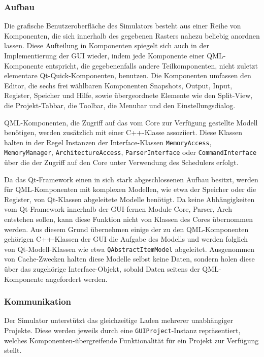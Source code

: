 \subsubsection{Aufbau}

Die grafische Benutzeroberfläche des Simulators besteht aus einer Reihe von
Komponenten, die sich innerhalb des gegebenen Rasters nahezu beliebig anordnen
lassen. Diese Aufteilung in Komponenten spiegelt sich auch in der
Implementierung der GUI wieder, indem jede Komponente einer QML-Komponente
entspricht, die gegebenenfalls andere Teilkomponenten, nicht zuletzt elementare
Qt-Quick-Komponenten, benutzen. Die Komponenten umfassen den Editor, die sechs
frei wählbaren Komponenten Snapshots, Output, Input, Register, Speicher und
Hilfe, sowie übergeordnete Elemente wie den Split-View, die Projekt-Tabbar, die
Toolbar, die Menubar und den Einstellungsdialog.

QML-Komponenten, die Zugriff auf das vom Core zur Verfügung gestellte Modell
benötigen, werden zusätzlich mit einer C++-Klasse assoziiert. Diese Klassen
halten in der Regel Instanzen der Interface-Klassen \texttt{MemoryAccess},
\texttt{MemoryManager}, \texttt{ArchitectureAccess}, \texttt{ParserInterface}
oder \texttt{CommandInterface}  über die der Zugriff auf den Core unter
Verwendung des Schedulers erfolgt.

Da das Qt-Framework einen in sich stark abgeschlossenen Aufbau besitzt, werden
für QML-Komponenten mit komplexen Modellen, wie etwa der Speicher oder die
Register, von Qt-Klassen abgeleitete Modelle benötigt. Da keine Abhängigkeiten
vom Qt-Framework innerhalb der GUI-fernen Module Core, Parser, Arch entstehen
sollen, kann diese Funktion nicht von Klassen des Cores übernommen werden. Aus
diesem Grund übernehmen einige der zu den QML-Komponenten gehörigen C++-Klassen
der GUI die Aufgabe des Modells und werden folglich von Qt-Modell-Klassen wie
etwa \texttt{QAbstractItemModel} abgeleitet. Ausgenommen von Cache-Zwecken
halten diese Modelle selbst keine Daten, sondern holen diese über das zugehörige
Interface-Objekt, sobald Daten seitens der QML-Komponente angefordert werden.

\subsubsection{Kommunikation}
\label{gui-kommunikation}

Der Simulator unterstützt das gleichzeitige Laden mehrerer unabhängiger
Projekte. Diese werden jeweils durch eine \texttt{GUIProject}-Instanz
repräsentiert, welches Komponenten-übergreifende Funktionalität für ein Projekt
zur Verfügung stellt.

